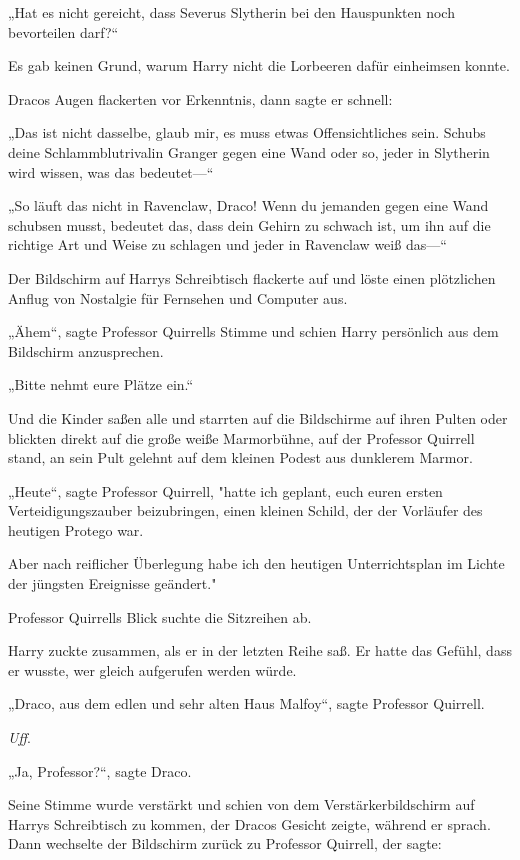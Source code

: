 {„Hat es nicht gereicht, dass Severus Slytherin bei den Hauspunkten noch bevorteilen darf?“

Es gab keinen Grund, warum Harry nicht die Lorbeeren dafür einheimsen konnte.

Dracos Augen flackerten vor Erkenntnis, dann sagte er schnell:

„Das ist nicht dasselbe, glaub mir, es muss etwas Offensichtliches sein. Schubs deine Schlammblutrivalin Granger gegen eine Wand oder so, jeder in Slytherin wird wissen, was das bedeutet—“

„So läuft das nicht in Ravenclaw, Draco! Wenn du jemanden gegen eine Wand schubsen musst, bedeutet das, dass dein Gehirn zu schwach ist, um ihn auf die richtige Art und Weise zu schlagen und jeder in Ravenclaw weiß das—“

Der Bildschirm auf Harrys Schreibtisch flackerte auf und löste einen plötzlichen Anflug von Nostalgie für Fernsehen und Computer aus.

„Ähem“, sagte Professor Quirrells Stimme und schien Harry persönlich aus dem Bildschirm anzusprechen.

„Bitte nehmt eure Plätze ein.“

Und die Kinder saßen alle und starrten auf die Bildschirme auf ihren Pulten oder blickten direkt auf die große weiße Marmorbühne, auf der Professor Quirrell stand, an sein Pult gelehnt auf dem kleinen Podest aus dunklerem Marmor.

„Heute“, sagte Professor Quirrell, "hatte ich geplant, euch euren ersten Verteidigungszauber beizubringen, einen kleinen Schild, der der Vorläufer des heutigen Protego war.

Aber nach reiflicher Überlegung habe ich den heutigen Unterrichtsplan im Lichte der jüngsten Ereignisse geändert."

Professor Quirrells Blick suchte die Sitzreihen ab.

Harry zuckte zusammen, als er in der letzten Reihe saß. Er hatte das Gefühl, dass er wusste, wer gleich aufgerufen werden würde.

„Draco, aus dem edlen und sehr alten Haus Malfoy“, sagte Professor Quirrell.

\emph{Uff}.

„Ja, Professor?“, sagte Draco.

Seine Stimme wurde verstärkt und schien von dem Verstärkerbildschirm auf Harrys Schreibtisch zu kommen, der Dracos Gesicht zeigte, während er sprach. Dann wechselte der Bildschirm zurück zu Professor Quirrell, der sagte:

}

